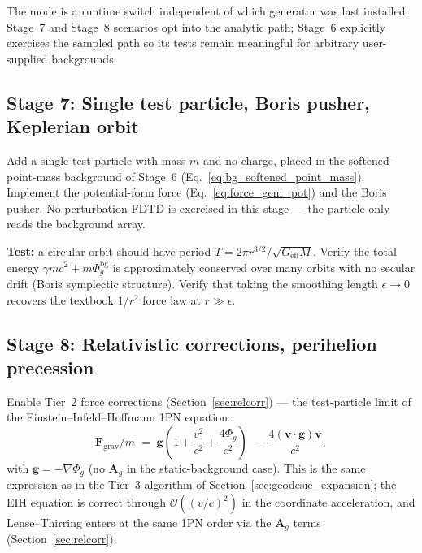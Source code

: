 \documentclass[11pt,a4paper]{article}
\newcommand{\vv}[1]{\mathbf{#1}}
\newcommand{\Phig}{\Phi_g}
\newcommand{\Ag}{\vv{A}_g}
\newcommand{\order}[1]{\mathcal{O}(#1)}
\begin{document}
The mode is a runtime switch independent of which generator was last
installed.  Stage~7 and Stage~8 scenarios opt into the analytic path; Stage~6
explicitly exercises the sampled path so its tests remain meaningful for
arbitrary user-supplied backgrounds.

\subsection{Stage 7: Single test particle, Boris pusher, Keplerian orbit}

Add a single test particle with mass $m$ and no charge, placed in the softened-point-mass background of Stage~6 (Eq.~\ref{eq:bg_softened_point_mass}).  Implement the potential-form force (Eq.~\ref{eq:force_gem_pot}) and the Boris pusher.  No perturbation FDTD is exercised in this stage --- the particle only reads the background array.

\textbf{Test:} a circular orbit should have period $T = 2\pi r^{3/2}/\sqrt{G_{\mathrm{eff}}M}$.  Verify the total energy $\gamma mc^2 + m\Phig^{\mathrm{bg}}$ is approximately conserved over many orbits with no secular drift (Boris symplectic structure).  Verify that taking the smoothing length $\epsilon\to0$ recovers the textbook $1/r^2$ force law at $r\gg\epsilon$.

\subsection{Stage 8: Relativistic corrections, perihelion precession}
\label{sec:stage_precession}

Enable Tier~2 force corrections (Section~\ref{sec:relcorr}) --- the
test-particle limit of the Einstein--Infeld--Hoffmann 1PN equation:
\begin{equation}
\label{eq:tier2_force}
  \vv{F}_{\mathrm{grav}}/m \;=\; \vv{g}\!\left(1 + \frac{v^2}{c^2} + \frac{4\Phig}{c^2}\right)
  \;-\; \frac{4(\vv{v}\cdot\vv{g})\vv{v}}{c^2},
\end{equation}
with $\vv{g}=-\nabla\Phig$ (no $\Ag$ in the static-background case).  This is
the same expression as in the Tier~3 algorithm of
Section~\ref{sec:geodesic_expansion}; the EIH equation is correct through
$\order{(v/c)^2}$ in the coordinate acceleration, and Lense--Thirring
enters at the same 1PN order via the $\Ag$ terms (Section~\ref{sec:relcorr}).
\end{document}
